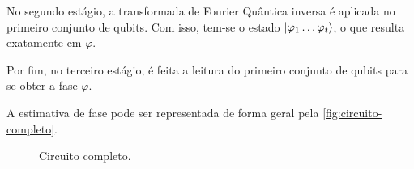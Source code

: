 No segundo estágio, a transformada de Fourier Quântica inversa é
aplicada no primeiro conjunto de qubits.
Com isso, tem-se o estado \(\ket{\varphi_1 \dots \varphi_t}\), o que resulta exatamente em
\(\varphi\).

Por fim, no terceiro estágio, é feita a leitura do primeiro conjunto de
qubits para se obter a fase \(\varphi\).

A estimativa de fase pode ser representada de forma geral pela \autoref{fig:circuito-completo}.

\begin{figure}[!htb]
    \centering
    
    \caption{Circuito completo.}
    \label{fig:circuito-completo}
\end{figure}
